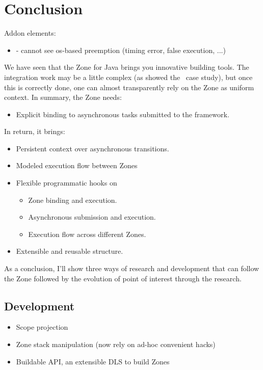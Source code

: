 
\chapter{Conclusion}
\label{ch:conclusion}


Addon elements:
\begin{itemize}
\item - cannot see os-based preemption (timing error, false execution, ...)
\end{itemize}

We have seen that the Zone for Java brings you innovative building tools. The integration work may be a little complex (as showed the \vertx\ case study), but once this is correctly done, one can almost transparently rely on the Zone as uniform context. In summary, the Zone needs:
\begin{itemize}
\item Explicit binding to asynchronous tasks submitted to the framework.
\end{itemize}

In return, it brings:
\begin{itemize}
\item Persistent context over asynchronous transitions.
\item Modeled execution flow between Zones
\item Flexible programmatic hooks on
  \begin{itemize}
  \item Zone binding and execution.
  \item Asynchronous submission and execution.
  \item Execution flow across different Zones.
  \end{itemize}
\item Extensible and reusable structure.
\end{itemize}

As a conclusion, I'll show three ways of research and development that can follow the Zone followed by the evolution of point of interest through the research.

\section{Development}

\begin{itemize}
\item Scope projection
\item Zone stack manipulation (now rely on ad-hoc convenient hacks)
\item Buildable API, an extensible DLS to build Zones
\end{itemize}

